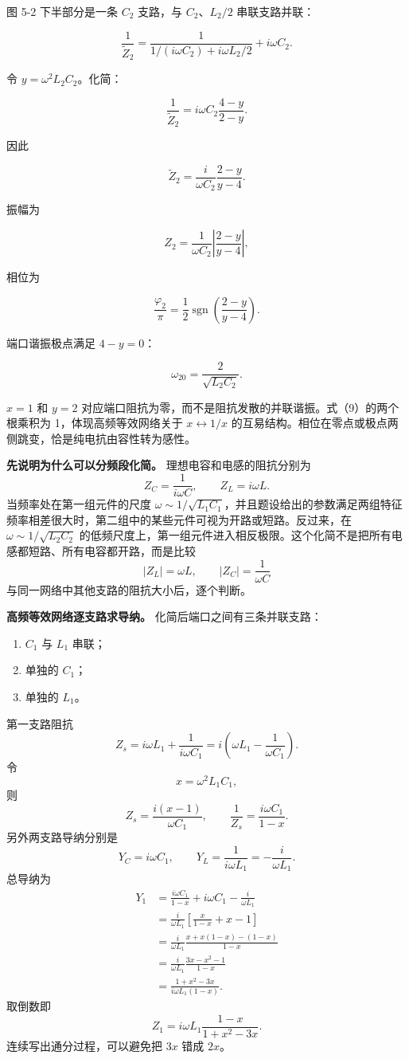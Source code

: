 \documentclass[12pt,a4paper,UTF8]{ctexart}
\newcommand{\tightlist}{\setlength{\itemsep}{0pt}\setlength{\parskip}{0pt}}
\begin{document}
图 5-2 下半部分是一条 \(C_2\) 支路，与 \(C_2\)、\(L_2/2\) 串联支路并联：

\[
\frac1{\widetilde Z_2}
=\frac1{1/(i\omega C_2)+i\omega L_2/2}
+i\omega C_2. \tag{10}
\]

令 \(y=\omega^2L_2C_2\)。化简：

\[
\frac1{\widetilde Z_2}
=i\omega C_2\frac{4-y}{2-y}. \tag{11}
\]

因此

\[
\widetilde Z_2
=\frac{i}{\omega C_2}\frac{2-y}{y-4}. \tag{12}
\]

振幅为

\[
\boxed{
Z_2=\frac1{\omega C_2}
\left|\frac{2-y}{y-4}\right|}, \tag{13}
\]

相位为

\[
\boxed{
\frac{\varphi_2}{\pi}
=\frac12\operatorname{sgn}
\left(\frac{2-y}{y-4}\right)}. \tag{14}
\]

端口谐振极点满足 \(4-y=0\)：

\[
\boxed{\omega_{20}=\frac2{\sqrt{L_2C_2}}}. \tag{15}
\]

\(x=1\) 和 \(y=2\)
对应端口阻抗为零，而不是阻抗发散的并联谐振。式（9）的两个根乘积为
1，体现高频等效网络关于 \(x\leftrightarrow1/x\)
的互易结构。相位在零点或极点两侧跳变，恰是纯电抗由容性转为感性。

\textbf{先说明为什么可以分频段化简。} 理想电容和电感的阻抗分别为 \[
Z_C=\frac1{i\omega C},\qquad Z_L=i\omega L.
\] 当频率处在第一组元件的尺度
\(\omega\sim1/\sqrt{L_1C_1}\)，并且题设给出的参数满足两组特征频率相差很大时，第二组中的某些元件可视为开路或短路。反过来，在
\(\omega\sim1/\sqrt{L_2C_2}\)
的低频尺度上，第一组元件进入相反极限。这个化简不是把所有电感都短路、所有电容都开路，而是比较
\[
|Z_L|=\omega L,\qquad |Z_C|=\frac1{\omega C}
\] 与同一网络中其他支路的阻抗大小后，逐个判断。

\textbf{高频等效网络逐支路求导纳。} 化简后端口之间有三条并联支路：

\begin{enumerate}
\def\labelenumi{\arabic{enumi}.}
\tightlist
\item
  \(C_1\) 与 \(L_1\) 串联；
\item
  单独的 \(C_1\)；
\item
  单独的 \(L_1\)。
\end{enumerate}

第一支路阻抗 \[
Z_s=i\omega L_1+\frac1{i\omega C_1}
=i\left(\omega L_1-\frac1{\omega C_1}\right).
\] 令 \[
x=\omega^2L_1C_1,
\] 则 \[
Z_s=\frac{i(x-1)}{\omega C_1},\qquad
\frac1{Z_s}=\frac{i\omega C_1}{1-x}.
\] 另外两支路导纳分别是 \[
Y_C=i\omega C_1,\qquad
Y_L=\frac1{i\omega L_1}=-\frac{i}{\omega L_1}.
\] 总导纳为 \[
\begin{aligned}
Y_1
&=\frac{i\omega C_1}{1-x}+i\omega C_1-\frac{i}{\omega L_1}\\
&=\frac{i}{\omega L_1}\left[
\frac{x}{1-x}+x-1
\right]\\
&=\frac{i}{\omega L_1}
\frac{x+x(1-x)-(1-x)}{1-x}\\
&=\frac{i}{\omega L_1}
\frac{3x-x^2-1}{1-x}\\
&=\frac{1+x^2-3x}{i\omega L_1(1-x)}.
\end{aligned}
\] 取倒数即 \[
Z_1=i\omega L_1\frac{1-x}{1+x^2-3x}.
\] 连续写出通分过程，可以避免把 \(3x\) 错成 \(2x\)。
\end{document}

